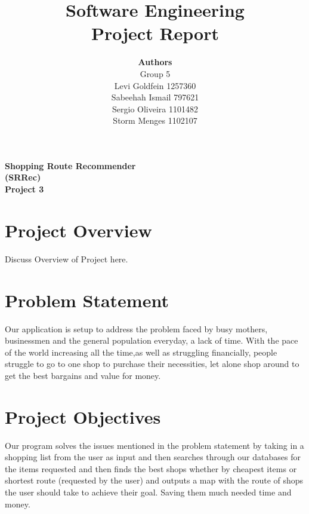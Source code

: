 \documentclass[12pt]{article}
\begin{document}
 
\title{Software Engineering\\Project Report}
\author{\textbf{Authors}\\Group 5\\Levi Goldfein 1257360\\Sabeehah Ismail 797621\\ Sergio Oliveira 1101482 \\Storm Menges 1102107}
\maketitle

\begin{center}
\LARGE
\textbf{Shopping Route Recommender\\(SRRec)\\Project 3}
\end{center}
\pagebreak



\tableofcontents
\pagebreak

\section{Project Overview}
Discuss Overview of Project here.

\section{Problem Statement}
Our application is setup to address the problem faced by  busy mothers, businessmen and the general population everyday, a lack of time. With the pace of the world increasing all the time,as well as struggling financially, people struggle to go to one shop to purchase their necessities, let alone shop around to get the best bargains and value for money.

\section{Project Objectives}
Our program solves the issues mentioned in the problem statement by taking in a shopping list from the user as input and then searches through our databases for the items requested and then finds the best shops whether by cheapest items or shortest route (requested by the user) and outputs a map with the route of shops the user should take to achieve their goal. Saving them much needed time and money.
\end{document}
